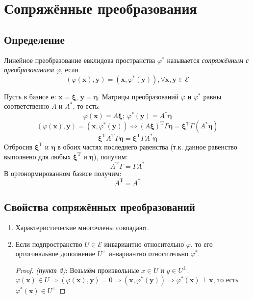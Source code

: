 	\section{Сопряжённые преобразования}
	\subsection{Определение}
	\begin{definition}
		Линейное преобразование евклидова пространства $\varphi^{*}$ называется \emph{сопряжённым с преобразованием $\varphi$}, если 
		\[\boxed {(\varphi (\textbf{x}), \textbf{y}) = (\textbf{x}, \varphi^{*}(\textbf{y})), \forall \textbf{x}, \textbf{y} \in \mathcal{E}}\]
	\end{definition}
Пусть в базисе $\textbf{e}$: $\textbf{x}= \bm\xi$, $\textbf{y} = \bm\eta$. Матрицы преобразований $\varphi$ и $\varphi^*$ равны соответственно $A$ и $A^*$, то есть:
\[\varphi(\textbf{x}) = A\bm\xi;~ \varphi^{*}(\textbf{y})=A^{*}\bm\eta\]
\[(\varphi (\textbf{x}), \textbf{y}) = (\textbf{x}, \varphi^{*}(\textbf{y})) \Leftrightarrow (A\bm\xi)^{\text{T}}\Gamma\bm\eta = \bm\xi^{\text{T}}\Gamma (A^{*}\bm\eta)\]
\[\bm\xi^{\text{T}}A^{\text{T}}\Gamma\bm\eta = \bm\xi^{\text{T}}\Gamma A^{*}\bm\eta\]
Отбросив $\bm\xi^{\text{T}}$ и $\bm\eta$ в обоих частях последнего равенства (т.к. данное равенство выполнено для любых $\bm\xi^{\text{T}}$ и $\bm\eta$), получим:
\[\boxed{A^{\text{T}}\Gamma = \Gamma A^{*}}\]
В ортонормированном базисе получим:
\[\boxed{A^{\text{T}} = A^{*}}\]
\subsection{Свойства сопряжённых преобразований}
\begin{enumerate}
	\item Характеристические многочлены совпадают.
	\item Если подпространство $U \in  \mathcal{E}$ инвариантно относительно $\varphi$, то его ортогональное дополнение $U^{\perp}$ инвариантно относительно $\varphi^{*}$.
	\begin{proof}{\itshape\!(пункт 2)}:
	Возьмём произвольные $x \in U$ и $y \in U^{\perp}$.\\
	$\varphi (\textbf{x}) \in U \Rightarrow (\varphi (\textbf{x}), \textbf{y}) = 0 \Rightarrow (\textbf{x}, \varphi^{*}(\textbf{y}))  \Rightarrow \varphi^*(\textbf{x}) \perp \textbf{x}$, то есть $\varphi^*(\textbf{x}) \in U^{\perp} $
	\end{proof}
\end{enumerate}

